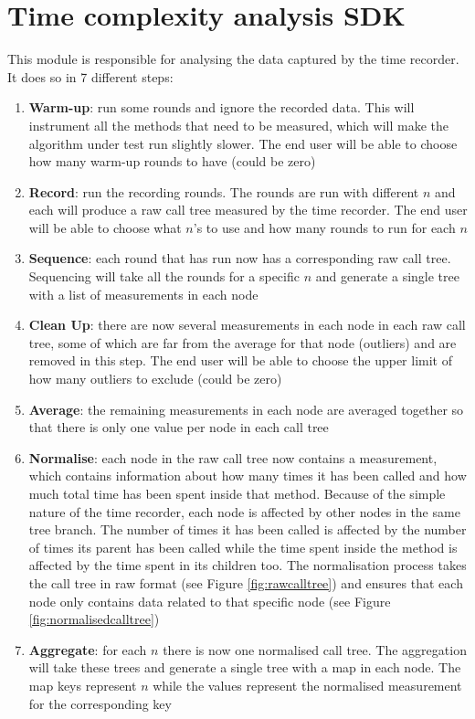 \section{Time complexity analysis SDK}
This module is responsible for analysing the data captured by the time recorder. It does so in 7 different steps:
\begin{enumerate}
  \item \textbf{Warm-up}: run some rounds and ignore the recorded data. This will instrument all the methods that need to be measured, which will make the algorithm under test run slightly slower. The end user will be able to choose how many warm-up rounds to have (could be zero)
  \item \textbf{Record}: run the recording rounds. The rounds are run with different $n$ and each will produce a raw call tree measured by the time recorder. The end user will be able to choose what $n$'s to use and how many rounds to run for each $n$
  \item \textbf{Sequence}: each round that has run now has a corresponding raw call tree. Sequencing will take all the rounds for a specific $n$ and generate a single tree with a list of measurements in each node
  \item \textbf{Clean Up}: there are now several measurements in each node in each raw call tree, some of which are far from the average for that node (outliers) and are removed in this step. The end user will be able to choose the upper limit of how many outliers to exclude (could be zero)
  \item \textbf{Average}:  the remaining measurements in each node are averaged together so that there is only one value per node in each call tree
  \item \textbf{Normalise}: each node in the raw call tree now contains a measurement, which contains information about how many times it has been called and how much total time has been spent inside that method. Because of the simple nature of the time recorder, each node is affected by other nodes in the same tree branch. The number of times it has been called is affected by the number of times its parent has been called while the time spent inside the method is affected by the time spent in its children too. The normalisation process takes the call tree in raw format (see Figure \ref{fig:rawcalltree}) and ensures that each node only contains data related to that specific node (see Figure \ref{fig:normalisedcalltree})
  \item \textbf{Aggregate}: for each $n$ there is now one normalised call tree. The aggregation will take these trees and generate a single tree with a map in each node. The map keys represent $n$ while the values represent the normalised measurement for the corresponding key

\end{enumerate}
